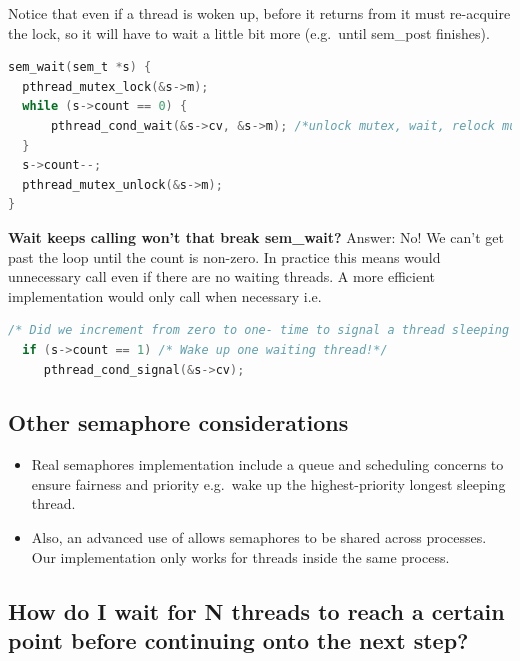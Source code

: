 Notice that even if a thread is woken up, before it returns from  it must re-acquire the lock, so it will have to wait a little bit more (e.g.~until sem\_post finishes).

\begin{lstlisting}[language=C]
sem_wait(sem_t *s) {
  pthread_mutex_lock(&s->m);
  while (s->count == 0) {
      pthread_cond_wait(&s->cv, &s->m); /*unlock mutex, wait, relock mutex*/
  }
  s->count--;
  pthread_mutex_unlock(&s->m);
}
\end{lstlisting}

\textbf{Wait  keeps calling  won't that break sem\_wait?} Answer: No! We can't get past the loop until the count is non-zero. In practice this means  would unnecessary call  even if there are no waiting threads. A more efficient implementation would only call  when necessary i.e.

\begin{lstlisting}[language=C]
  /* Did we increment from zero to one- time to signal a thread sleeping inside sem_post */
  if (s->count == 1) /* Wake up one waiting thread!*/
     pthread_cond_signal(&s->cv);
\end{lstlisting}

\subsection{Other semaphore considerations}\label{other-semaphore-considerations}

\begin{itemize}
\tightlist
\item
  Real semaphores implementation include a queue and scheduling concerns to ensure fairness and priority e.g.~wake up the highest-priority longest sleeping thread.
\item
  Also, an advanced use of  allows semaphores to be shared across processes. Our implementation only works for threads inside the same process.
\end{itemize}

\subsection{How do I wait for N threads to reach a certain point before continuing onto the next step?}\label{how-do-i-wait-for-n-threads-to-reach-a-certain-point-before-continuing-onto-the-next-step}

